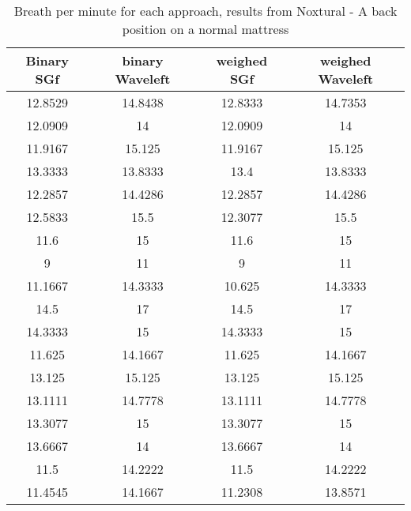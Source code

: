\begin{table}[h]
    \centering
    \begin{tabular}{|c|c|c|c|}
    \hline 
    Binary SGf & binary Waveleft & weighed  SGf & weighed Waveleft  \\%
    \hline 
    12.8529 & 14.8438 & 12.8333 & 14.7353 \\ %
    12.0909 & 14 & 12.0909 & 14  \\ %
    11.9167 & 15.125 & 11.9167 & 15.125 \\ %
    13.3333 & 13.8333 & 13.4 & 13.8333 \\ %
    12.2857 & 14.4286 & 12.2857 & 14.4286 \\ %
    12.5833 & 15.5 & 12.3077 & 15.5 \\ %
    11.6 & 15 & 11.6 & 15 \\ %
    9 & 11 & 9 & 11 \\ %
    11.1667 & 14.3333 & 10.625 & 14.3333 \\ %
    14.5 & 17 & 14.5 & 17 \\ %
    14.3333 & 15 & 14.3333 & 15 \\ %
    11.625 & 14.1667 & 11.625 & 14.1667 \\ %
    13.125 & 15.125 & 13.125 & 15.125 \\ %
    13.1111 & 14.7778 & 13.1111 & 14.7778 \\ %
    13.3077 & 15 & 13.3077 & 15 \\ %
    13.6667 & 14 & 13.6667 & 14 \\ %
    11.5 & 14.2222 & 11.5 & 14.2222 \\ %
    11.4545 & 14.1667 & 11.2308 & 13.8571 \\ %
    \hline 
    \end{tabular}
    \caption{Breath per minute for each approach, results from Noxtural
    - A back position on a normal mattress}
\end{table}

